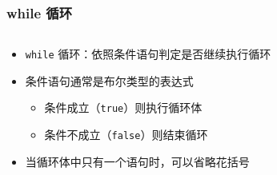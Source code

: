 \begin{frame}[fragile]
    \frametitle{while 循环}

    \begin{columns}
        \begin{overlayarea}{\textwidth}{.6\textheight}
            \begin{itemize}
                \item \lstinline|while| 循环：依照条件语句判定是否继续执行循环

                \item 条件语句通常是布尔类型的表达式

                    \begin{itemize}
                        \item<2-> 条件成立（\lstinline|true|）则执行循环体
                        \item<3-> 条件不成立（\lstinline|false|）则结束循环
                    \end{itemize}

                \item<4-> 当循环体中只有一个语句时，可以省略花括号
            \end{itemize}
        \end{overlayarea}

        \begin{overlayarea}{\textwidth}{.3\textheight}
            
        \end{overlayarea}
    \end{columns}
\end{frame}

